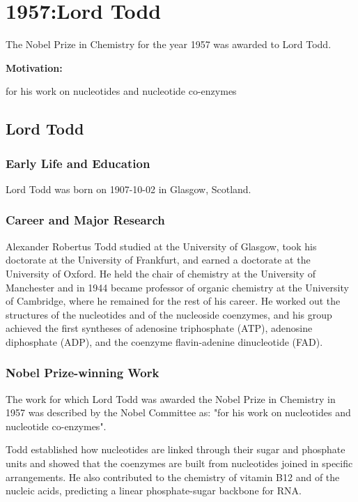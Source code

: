 \chapter{1957:Lord Todd}

\label{chap:chemistry1957}

The Nobel Prize in Chemistry for the year 1957 was awarded to Lord Todd.

\textbf{Motivation:}

for his work on nucleotides and nucleotide co-enzymes

\section{Lord Todd}

\subsection*{Early Life and Education}

Lord Todd was born on 1907-10-02 in Glasgow, Scotland.

\subsection*{Career and Major Research}

Alexander Robertus Todd studied at the University of Glasgow, took his doctorate at the University of Frankfurt, and earned a doctorate at the University of Oxford. He held the chair of chemistry at the University of Manchester and in 1944 became professor of organic chemistry at the University of Cambridge, where he remained for the rest of his career. He worked out the structures of the nucleotides and of the nucleoside coenzymes, and his group achieved the first syntheses of adenosine triphosphate (ATP), adenosine diphosphate (ADP), and the coenzyme flavin-adenine dinucleotide (FAD).

\subsection*{Nobel Prize-winning Work}

The work for which Lord Todd was awarded the Nobel Prize in Chemistry in 1957 was described by the Nobel Committee as: "for his work on nucleotides and nucleotide co-enzymes".

Todd established how nucleotides are linked through their sugar and phosphate units and showed that the coenzymes are built from nucleotides joined in specific arrangements. He also contributed to the chemistry of vitamin B12 and of the nucleic acids, predicting a linear phosphate-sugar backbone for RNA.

